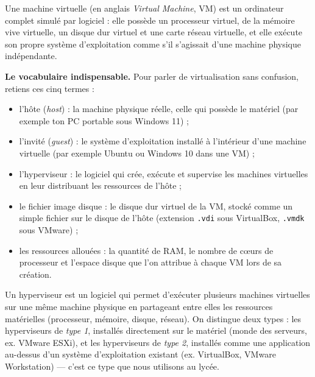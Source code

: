 \documentclass[11pt]{article}
\newcommand{\cle}[1]{{\popxbold\color{popdark}#1}}
\begin{document}
\begin{definition}
Une \cle{machine virtuelle} (en anglais \emph{Virtual Machine}, VM) est un ordinateur complet simulé par logiciel : elle possède un processeur virtuel, de la mémoire vive virtuelle, un disque dur virtuel et une carte réseau virtuelle, et elle exécute son propre système d'exploitation comme s'il s'agissait d'une machine physique indépendante.
\end{definition}

\textbf{Le vocabulaire indispensable.} Pour parler de virtualisation sans confusion, retiens ces cinq termes :

\begin{itemize}
\item l'\cle{hôte} (\emph{host}) : la machine physique réelle, celle qui possède le matériel (par exemple ton PC portable sous Windows 11) ;
\item l'\cle{invité} (\emph{guest}) : le système d'exploitation installé à l'intérieur d'une machine virtuelle (par exemple Ubuntu ou Windows 10 dans une VM) ;
\item l'\cle{hyperviseur} : le logiciel qui crée, exécute et supervise les machines virtuelles en leur distribuant les ressources de l'hôte ;
\item le \cle{fichier image disque} : le disque dur virtuel de la VM, stocké comme un simple fichier sur le disque de l'hôte (extension \texttt{.vdi} sous VirtualBox, \texttt{.vmdk} sous VMware) ;
\item les \cle{ressources allouées} : la quantité de RAM, le nombre de cœurs de processeur et l'espace disque que l'on attribue à chaque VM lors de sa création.
\end{itemize}

\begin{definition}[Hyperviseur]
Un \cle{hyperviseur} est un logiciel qui permet d'exécuter plusieurs machines virtuelles sur une même machine physique en partageant entre elles les ressources matérielles (processeur, mémoire, disque, réseau). On distingue deux types : les hyperviseurs de \emph{type 1}, installés directement sur le matériel (monde des serveurs, ex. VMware ESXi), et les hyperviseurs de \emph{type 2}, installés comme une application au-dessus d'un système d'exploitation existant (ex. VirtualBox, VMware Workstation) — c'est ce type que nous utilisons au lycée.
\end{definition}
\end{document}
